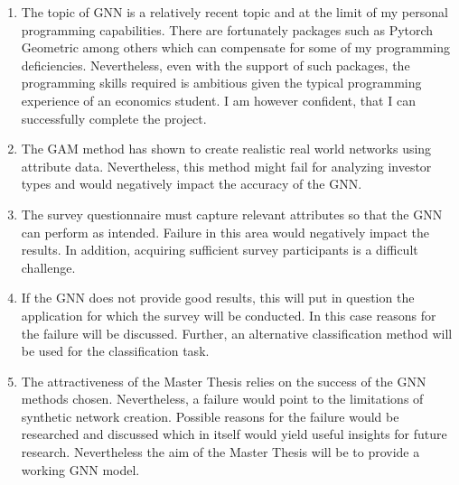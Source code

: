 \documentclass[12pt,a4paper]{article}
\begin{document}
	\begin{enumerate}
		
		\item The topic of GNN is a relatively recent topic and at the limit of my personal programming capabilities. There are fortunately packages
			such as Pytorch Geometric among others which can compensate for some of my programming deficiencies. Nevertheless, even with the support 
			of such packages, the programming skills required is ambitious given the typical programming experience of an economics student. I am
			however confident, that I can successfully complete the project.

		\item The GAM method has shown to create realistic real world networks using attribute data. Nevertheless, this method might fail for 
			analyzing investor types and would negatively impact the accuracy of the GNN.

		\item The survey questionnaire must capture relevant attributes so that the GNN can perform as intended. Failure in this area would negatively
			impact the results. In addition, acquiring sufficient survey participants is a difficult challenge.  

		\item If the GNN does not provide good results, this will put in question the application for which the survey will be conducted. In this case 
			reasons for the failure will be discussed. Further, an alternative classification method will be used for the classification task.

		\item The attractiveness of the Master Thesis relies on the success of the GNN methods chosen. Nevertheless, a failure would point to the 
			limitations of synthetic network creation. Possible reasons for the failure would be researched and discussed which in itself would yield
			useful insights for future research. Nevertheless the aim of the Master Thesis will be to provide a working GNN model.

	\end{enumerate} 

	\pagebreak
	
	
\end{document}
